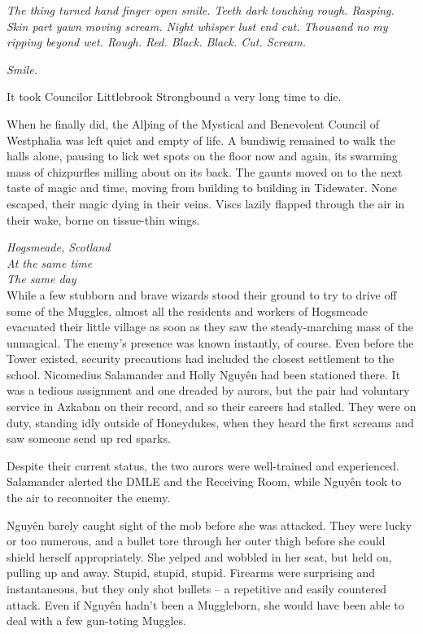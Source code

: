 \emph{The thing turned hand finger open smile. Teeth dark touching
rough. Rasping. Skin part yawn moving scream. Night whisper lust end
cut. Thousand no my ripping beyond wet. Rough. Red. Black. Black. Cut.
Scream.}

\emph{Smile.}

\mybreak

It took Councilor Littlebrook Strongbound a very long time to die.

When he finally did, the Alþing of the Mystical and Benevolent Council
of Westphalia was left quiet and empty of life. A bundiwig remained to
walk the halls alone, pausing to lick wet spots on the floor now and
again, its swarming mass of chizpurfles milling about on its back. The
gaunts moved on to the next taste of magic and time, moving from
building to building in Tidewater. None escaped, their magic dying in
their veins. Viscs lazily flapped through the air in their wake, borne
on tissue-thin wings.

\mybreak

\emph{Hogsmeade, Scotland}\\
\emph{At the same time}\\
\emph{The same day}\\

While a few stubborn and brave wizards stood their ground to try to
drive off some of the Muggles, almost all the residents and workers of
Hogsmeade evacuated their little village as soon as they saw the
steady-marching mass of the unmagical. The enemy's presence was known
instantly, of course. Even before the Tower existed, security
precautions had included the closest settlement to the school.
Nicomedius Salamander and Holly
Nguy\makebox[0pt][l]{\raisebox{0.5ex}{˜}}ên had been stationed there. It
was a tedious assignment and one dreaded by aurors, but the pair had
voluntary service in Azkaban on their record, and so their careers had
stalled. They were on duty, standing idly outside of Honeydukes, when
they heard the first screams and saw someone send up red sparks.

Despite their current status, the two aurors were well-trained and
experienced. Salamander alerted the DMLE and the Receiving Room, while
Nguy\makebox[0pt][l]{\raisebox{0.5ex}{˜}}ên took to the air to
reconnoiter the enemy.

Nguy\makebox[0pt][l]{\raisebox{0.5ex}{˜}}ên barely caught sight of the
mob before she was attacked. They were lucky or too numerous, and a
bullet tore through her outer thigh before she could shield herself
appropriately. She yelped and wobbled in her seat, but held on, pulling
up and away. Stupid, stupid, stupid. Firearms were surprising and
instantaneous, but they only shot bullets -- a repetitive and easily
countered attack. Even if Nguy\makebox[0pt][l]{\raisebox{0.5ex}{˜}}ên
hadn't been a Muggleborn, she would have been able to deal with a few
gun-toting Muggles.

